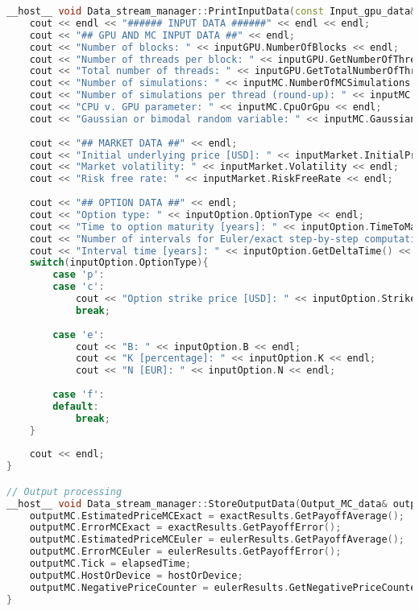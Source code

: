 \begin{lstlisting}[language=C++, caption={\texttt{libraries/CoreLibraries/DataStreamManager/Data\_stream\_manager.cu}}]
__host__ void Data_stream_manager::PrintInputData(const Input_gpu_data& inputGPU, const Input_option_data& inputOption, const Input_market_data& inputMarket, const Input_MC_data& inputMC) const{
	cout << endl << "###### INPUT DATA ######" << endl << endl;
	cout << "## GPU AND MC INPUT DATA ##" << endl;
	cout << "Number of blocks: " << inputGPU.NumberOfBlocks << endl;
	cout << "Number of threads per block: " << inputGPU.GetNumberOfThreadsPerBlock() << endl;
	cout << "Total number of threads: " << inputGPU.GetTotalNumberOfThreads() << endl; 
	cout << "Number of simulations: " << inputMC.NumberOfMCSimulations << endl;
	cout << "Number of simulations per thread (round-up): " << inputMC.GetNumberOfSimulationsPerThread(inputGPU) << endl;
	cout << "CPU v. GPU parameter: " << inputMC.CpuOrGpu << endl;
	cout << "Gaussian or bimodal random variable: " << inputMC.GaussianOrBimodal << endl;
	
	cout << "## MARKET DATA ##" << endl;
	cout << "Initial underlying price [USD]: " << inputMarket.InitialPrice << endl;
	cout << "Market volatility: " << inputMarket.Volatility << endl;
	cout << "Risk free rate: " << inputMarket.RiskFreeRate << endl; 
	
	cout << "## OPTION DATA ##" << endl;
	cout << "Option type: " << inputOption.OptionType << endl; 
	cout << "Time to option maturity [years]: " << inputOption.TimeToMaturity << endl;
	cout << "Number of intervals for Euler/exact step-by-step computation: " << inputOption.NumberOfIntervals << endl;
	cout << "Interval time [years]: " << inputOption.GetDeltaTime() << endl;
	switch(inputOption.OptionType){
		case 'p':
		case 'c':
			cout << "Option strike price [USD]: " << inputOption.StrikePrice << endl;
			break;
		
		case 'e':
			cout << "B: " << inputOption.B << endl;
			cout << "K [percentage]: " << inputOption.K << endl;
			cout << "N [EUR]: " << inputOption.N << endl;
		
		case 'f':
		default:
			break;
	}
	
	cout << endl;	
}

// Output processing
__host__ void Data_stream_manager::StoreOutputData(Output_MC_data& outputMC, const Statistics exactResults, const Statistics eulerResults, double elapsedTime, char hostOrDevice) const{
	outputMC.EstimatedPriceMCExact = exactResults.GetPayoffAverage();
	outputMC.ErrorMCExact = exactResults.GetPayoffError();
	outputMC.EstimatedPriceMCEuler = eulerResults.GetPayoffAverage();
	outputMC.ErrorMCEuler = eulerResults.GetPayoffError();
	outputMC.Tick = elapsedTime;
	outputMC.HostOrDevice = hostOrDevice;
	outputMC.NegativePriceCounter = eulerResults.GetNegativePriceCounter();
}


\end{lstlisting}
